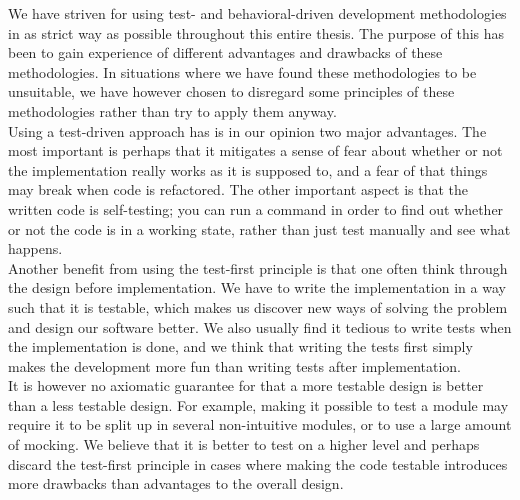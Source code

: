 
We have striven for using test- and behavioral-driven development
methodologies in as strict way as possible throughout this entire
thesis. The purpose of this has been to gain experience of different
advantages and drawbacks of these methodologies. In situations where we
have found these methodologies to be unsuitable, we have however chosen
to disregard some principles of these methodologies rather than try to
apply them anyway.\\

Using a test-driven approach has is in our opinion two major advantages.
The most important is perhaps that it mitigates a sense of fear about
whether or not the implementation really works as it is supposed to, and
a fear of that things may break when code is refactored. The other
important aspect is that the written code is self-testing; you can run a
command in order to find out whether or not the code is in a working
state, rather than just test manually and see what happens.\\

Another benefit from using the test-first principle is that one often
think through the design before implementation. We have to write the
implementation in a way such that it is testable, which makes us
discover new ways of solving the problem and design our software better.
We also usually find it tedious to write tests when the implementation
is done, and we think that writing the tests first simply makes the
development more fun than writing tests after implementation.\\

It is however no axiomatic guarantee for that a more testable design is
better than a less testable design. For example, making it possible to
test a module may require it to be split up in several non-intuitive
modules, or to use a large amount of mocking. We believe that it is better
to test on a higher level and perhaps discard the test-first principle
in cases where making the code testable introduces more drawbacks than
advantages to the overall design.\\
